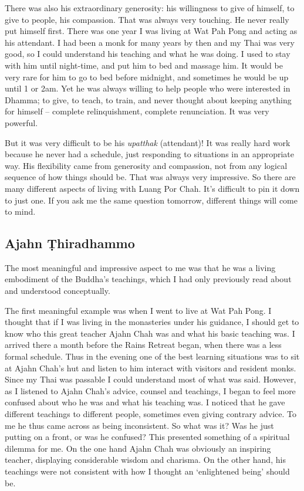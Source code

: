 There was also his extraordinary generosity: his willingness to give of
himself, to give to people, his compassion. That was always very
touching. He never really put himself first. There was one year I was
living at Wat Pah Pong and acting as his attendant. I had been a monk
for many years by then and my Thai was very good, so I could understand
his teaching and what he was doing. I used to stay with him until
night-time, and put him to bed and massage him. It would be very rare
for him to go to bed before midnight, and sometimes he would be up until
1 or 2am. Yet he was always willing to help people who were interested
in Dhamma; to give, to teach, to train, and never thought about keeping
anything for himself -- complete relinquishment, complete renunciation. 
It was very powerful. 

But it was very difficult to be his \emph{upatthak} (attendant)! It was
really hard work because he never had a schedule, just responding to
situations in an appropriate way. His flexibility came from generosity
and compassion, not from any logical sequence of how things should be. 
That was always very impressive. So there are many different aspects of
living with Luang Por Chah. It's difficult to pin it down to just one. 
If you ask me the same question tomorrow, different things will come to
mind. 

\subsection{Ajahn Ṭhiradhammo}

The most meaningful and impressive aspect to me was that he was a living
embodiment of the Buddha's teachings, which I had only previously read
about and understood conceptually. 

The first meaningful example was when I went to live at Wat Pah Pong. I
thought that if I was living in the monasteries under his guidance, I
should get to know who this great teacher Ajahn Chah was and what his
basic teaching was. I arrived there a month before the Rains Retreat
began, when there was a less formal schedule. Thus in the evening one of
the best learning situations was to sit at Ajahn Chah's hut and listen
to him interact with visitors and resident monks. Since my Thai was
passable I could understand most of what was said. However, as I
listened to Ajahn Chah's advice, counsel and teachings, I began to feel
more confused about who he was and what his teaching was. I noticed that
he gave different teachings to different people, sometimes even giving
contrary advice. To me he thus came across as being inconsistent. So
what was it? Was he just putting on a front, or was he confused? This
presented something of a spiritual dilemma for me. On the one hand Ajahn
Chah was obviously an inspiring teacher, displaying considerable wisdom
and charisma. On the other hand, his teachings were not consistent with
how I thought an `enlightened being' should be. 

